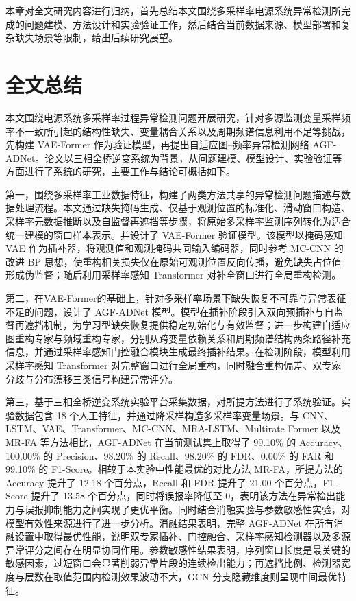 \documentclass[bachelor, vlined]{DissertUESTC}
\begin{document}
        本章对全文研究内容进行归纳，首先总结本文围绕多采样率电源系统异常检测所完成的问题建模、方法设计和实验验证工作，然后结合当前数据来源、模型部署和复杂缺失场景等限制，给出后续研究展望。

        \section{全文总结}

        本文围绕电源系统多采样率过程异常检测问题开展研究，针对多源监测变量采样频率不一致所引起的结构性缺失、变量耦合关系以及周期频谱信息利用不足等挑战，先构建 VAE-Former 作为验证模型，再提出自适应图--频率异常检测网络 AGF-ADNet。论文以三相全桥逆变系统为背景，从问题建模、模型设计、实验验证等方面进行了系统的研究，主要工作与结论可概括如下。

        第一，围绕多采样率工业数据特征，构建了两类方法共享的异常检测问题描述与数据处理流程。本文通过缺失掩码生成、仅基于观测位置的标准化、滑动窗口构造、采样率元数据推断以及自监督再遮挡等步骤，将原始多采样率监测序列转化为适合统一建模的窗口样本表示。并设计了 VAE-Former 验证模型。该模型以掩码感知 VAE 作为插补器，将观测值和观测掩码共同输入编码器，同时参考 MC-CNN 的改进 BP 思想，使重构相关损失仅在原始可观测位置反向传播，避免缺失占位值形成伪监督；随后利用采样率感知 Transformer 对补全窗口进行全局重构检测。

        第二，在VAE-Former的基础上，针对多采样率场景下缺失恢复不可靠与异常表征不足的问题，设计了 AGF-ADNet 模型。模型在插补阶段引入双向预插补与自监督再遮挡机制，为学习型缺失恢复提供稳定初始化与有效监督；进一步构建自适应图重构专家与频域重构专家，分别从跨变量依赖关系和周期频谱结构两条路径补充信息，并通过采样率感知门控融合模块生成最终插补结果。在检测阶段，模型利用采样率感知 Transformer 对完整窗口进行全局重构，同时融合重构偏差、双专家分歧与分布漂移三类信号构建异常评分。

        第三，基于三相全桥逆变系统实验平台采集数据，对所提方法进行了系统验证。实验数据包含 18 个人工特征，并通过降采样构造多采样率变量场景。与 CNN、LSTM、VAE、Transformer、MC-CNN、MRA-LSTM、Multirate Former 以及 MR-FA 等方法相比，AGF-ADNet 在当前测试集上取得了 99.10\% 的 Accuracy、100.00\% 的 Precision、98.20\% 的 Recall、98.20\% 的 FDR、0.00\% 的 FAR 和 99.10\% 的 F1-Score。相较于本实验中性能最优的对比方法 MR-FA，所提方法的 Accuracy 提升了 12.18 个百分点，Recall 和 FDR 提升了 21.00 个百分点，F1-Score 提升了 13.58 个百分点，同时将误报率降低至 0，表明该方法在异常检出能力与误报抑制能力之间实现了更优平衡。同时结合消融实验与参数敏感性实验，对模型有效性来源进行了进一步分析。消融结果表明，完整 AGF-ADNet 在所有消融设置中取得最优性能，说明双专家插补、门控融合、采样率感知检测器以及多源异常评分之间存在明显协同作用。参数敏感性结果表明，序列窗口长度是最关键的敏感因素，过短窗口会显著削弱异常片段的连续检出能力；再遮挡比例、检测器宽度与层数在取值范围内检测效果波动不大，GCN 分支隐藏维度则呈现中间最优特征。
\end{document}
